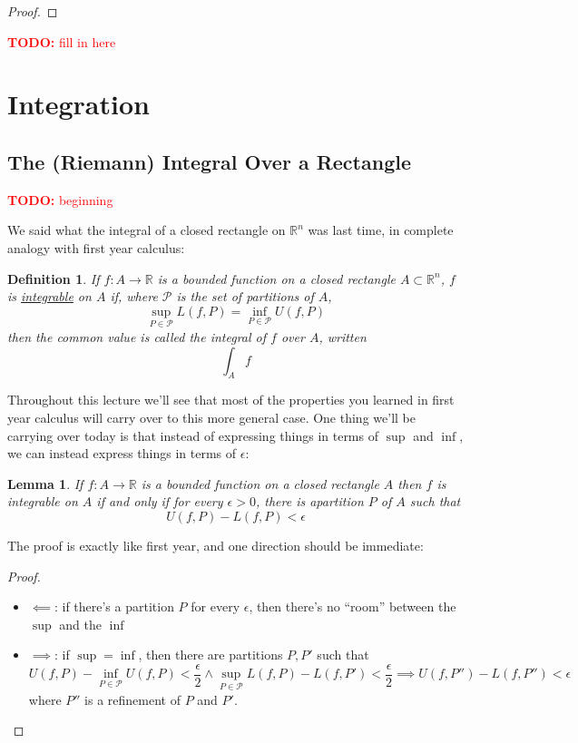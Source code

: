 \documentclass{article}
\newtheorem{lemma}{Lemma}
\newtheorem{definition}{Definition}
\newcommand{\reals}[0]{\mathbb{R}}
\newcommand{\mc}[1]{\mathcal{#1}}
\newcommand{\TODO}[1]{\textcolor{red}{\textbf{TODO:} #1}}
\begin{document}
\begin{proof}
\end{proof}

\TODO{fill in here}

\section{Integration}

\subsection{The (Riemann) Integral Over a Rectangle}

\TODO{beginning}

We said what the integral of a closed rectangle on \(\reals^n\) was last time, in complete analogy with first year calculus:
\begin{definition}
  If \(f: A \to \reals\) is a bounded function on a closed rectangle \(A \subset \reals^n\), \(f\) is \underline{integrable} on \(A\) if, where \(\mc{P}\) is the set of partitions of \(A\),
  \begin{equation}\sup_{P \in \mc{P}} L(f, P) = \inf_{P \in \mc{P}} U(f, P)\end{equation}
  then the common value is called the integral of \(f\) over \(A\), written
  \begin{equation}\int_Af\end{equation}
\end{definition}
Throughout this lecture we'll see that most of the properties you learned in first year calculus will carry over to this more general case. One thing we'll be carrying over today is that instead of expressing things in terms of \(\sup\) and \(\inf\), we can instead express things in terms of \(\epsilon\):
\begin{lemma}
  If \(f: A \to \reals\) is a bounded function on a closed rectangle \(A\) then \(f\) is integrable on \(A\) if and only if for every \(\epsilon > 0\), there is apartition \(P\) of \(A\) such that
  \begin{equation}U(f, P) - L(f, P) < \epsilon\end{equation}
\end{lemma}
The proof is exactly like first year, and one direction should be immediate:
\begin{proof}
\begin{itemize}
  \item \(\impliedby\): if there's a partition \(P\) for every \(\epsilon\), then there's no ``room'' between the \(\sup\) and the \(\inf\)
  \item \(\implies\): if \(\sup = \inf\), then there are partitions \(P, P'\) such that
  \begin{equation}U(f, P) - \inf_{P \in \mc{P}} U(f, P) < \frac{\epsilon}{2} \land \sup_{P \in \mc{P}}L(f, P) - L(f, P') < \frac{\epsilon}{2} \implies U(f, P'') - L(f, P'') < \epsilon\end{equation}
  where \(P''\) is a refinement of \(P\) and \(P'\).
\end{itemize}
\end{proof}
\end{document}
